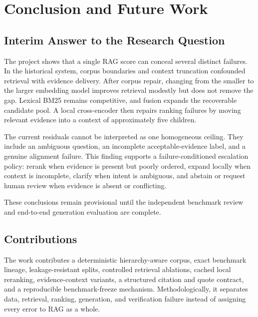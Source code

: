 \chapter[Conclusion]{Conclusion and Future Work}
\label{chap:conclusion}


\section{Interim Answer to the Research Question}

The project shows that a single RAG score can conceal several distinct failures. In the historical system, corpus boundaries and context truncation confounded retrieval with evidence delivery. After corpus repair, changing from the smaller to the larger embedding model improves retrieval modestly but does not remove the gap. Lexical BM25 remains competitive, and fusion expands the recoverable candidate pool. A local cross-encoder then repairs ranking failures by moving relevant evidence into a context of approximately five children.

The current residuals cannot be interpreted as one homogeneous ceiling. They include an ambiguous question, an incomplete acceptable-evidence label, and a genuine alignment failure. This finding supports a failure-conditioned escalation policy: rerank when evidence is present but poorly ordered, expand locally when context is incomplete, clarify when intent is ambiguous, and abstain or request human review when evidence is absent or conflicting.

These conclusions remain provisional until the independent benchmark review and end-to-end generation evaluation are complete.

\section{Contributions}

The work contributes a deterministic hierarchy-aware corpus, exact benchmark lineage, leakage-resistant splits, controlled retrieval ablations, cached local reranking, evidence-context variants, a structured citation and quote contract, and a reproducible benchmark-freeze mechanism. Methodologically, it separates data, retrieval, ranking, generation, and verification failure instead of assigning every error to RAG as a whole.


